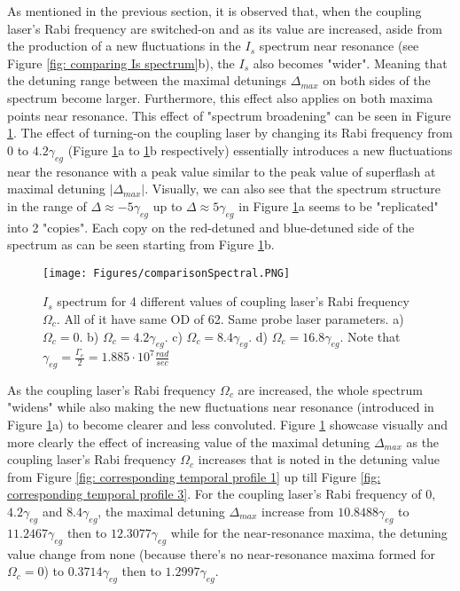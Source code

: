 As mentioned in the previous section, it is observed that, when the coupling laser's Rabi frequency are switched-on and as its value are increased, aside from the production of a new fluctuations in the $I_{s}$ spectrum near resonance (see Figure \ref{fig: comparing Is spectrum}b), the $I_{s}$ also becomes "wider". Meaning  that the detuning range between the maximal detunings $\Delta_{max}$ on both sides of the spectrum become larger. Furthermore, this effect also applies on both maxima points near resonance. This effect of "spectrum broadening" can be seen in Figure \ref{fig: compare Is spectrums}. The effect of turning-on the coupling laser by changing its Rabi frequency from $0$ to $4.2\gamma_{eg}$ (Figure \ref{fig: compare Is spectrums}a to \ref{fig: compare Is spectrums}b respectively) essentially introduces a new fluctuations near the resonance with a peak value similar to the peak value of superflash at maximal detuning $|\Delta_{max}|$. Visually, we can also see that the spectrum structure in the range of  $\Delta \approx -5\gamma_{eg}$ up to $\Delta \approx 5\gamma_{eg}$ in Figure \ref{fig: compare Is spectrums}a seems to be "replicated" into 2 "copies". Each copy on the red-detuned and blue-detuned side of the spectrum as can be seen starting from Figure \ref{fig: compare Is spectrums}b.

\begin{figure}[h!]
    \centering
    \texttt{[image: Figures/comparisonSpectral.PNG]}
    \caption{$I_{s}$ spectrum for 4 different values of coupling laser's Rabi frequency $\Omega_{c}$. All of it have same OD of 62. Same probe laser parameters. a) $\Omega_{c} = 0$. b) $\Omega_{c} = 4.2\gamma_{eg}$. c) $\Omega_{c} = 8.4\gamma_{eg}$. d) $\Omega_{c} = 16.8\gamma_{eg}$. Note that $\gamma_{eg} = \frac{\Gamma_{e}}{2} = 1.885 \cdot 10^{7} \frac{rad}{sec}$}
    \label{fig: compare Is spectrums}
\end{figure}

As the coupling laser's Rabi frequency $\Omega_{c}$ are increased, the whole spectrum "widens" while also making the new fluctuations near resonance (introduced in Figure \ref{fig: compare Is spectrums}a) to become clearer and less convoluted. Figure \ref{fig: compare Is spectrums} showcase visually and more clearly the effect of increasing value of the maximal detuning $\Delta_{max}$ as the coupling laser's Rabi frequency $\Omega_{c}$ increases that is noted in the detuning value from Figure \ref{fig: corresponding temporal profile 1} up till Figure \ref{fig: corresponding temporal profile 3}. For the coupling laser's Rabi frequency of $0$, $4.2\gamma_{eg}$ and $8.4\gamma_{eg}$, the maximal detuning $\Delta_{max}$ increase from $10.8488\gamma_{eg}$ to $11.2467\gamma_{eg}$ then to $12.3077\gamma_{eg}$ while for the near-resonance maxima, the detuning value change from none (because there's no near-resonance maxima formed for $\Omega_{c} = 0$) to $0.3714\gamma_{eg}$ then to $1.2997\gamma_{eg}$.


